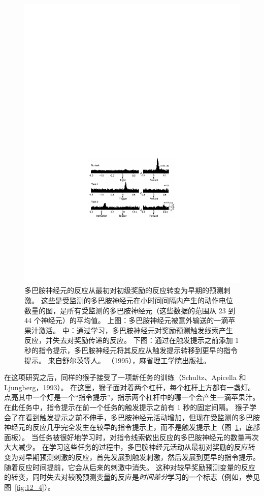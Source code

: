 \begin{figure}[!htb]
	\centering
	\includegraphics[width=0.5\linewidth]{chap12/fig_12_3}
	\caption{多巴胺神经元的反应从最初对初级奖励的反应转变为早期的预测刺激。
		这些是受监测的多巴胺神经元在小时间间隔内产生的动作电位数量的图，是所有受监测的多巴胺神经元（这些数据的范围从 23 到 44 个神经元）的平均值。
		上图：多巴胺神经元被意外输送的一滴苹果汁激活。
		中：通过学习，多巴胺神经元对奖励预测触发线索产生反应，并失去对奖励传递的反应。
		下图：通过在触发提示之前添加 1 秒的指令提示，多巴胺神经元将其反应从触发提示转移到更早的指令提示。
		来自舒尔茨等人。 （1995），麻省理工学院出版社。
		\label{fig:12_3}}
\end{figure}



在这项研究之后，同样的猴子接受了一项新任务的训练（Schultz、Apicella 和 Ljungberg，1993）。
在这里，猴子面对着两个杠杆，每个杠杆上方都有一盏灯。
点亮其中一个灯是一个“指令提示”，指示两个杠杆中的哪一个会产生一滴苹果汁。
在此任务中，指令提示在前一个任务的触发提示之前有 1 秒的固定间隔。
猴子学会了在看到触发提示之前不伸手，多巴胺神经元活动增加，但现在受监测的多巴胺神经元的反应几乎完全发生在较早的指令提示上，而不是触发提示上（图~\ref{fig:12_3}，底部面板）。
当任务被很好地学习时，对指令线索做出反应的多巴胺神经元的数量再次大大减少。
在学习这些任务的过程中，多巴胺神经元活动从最初对奖励的反应转变为对早期预测刺激的反应，首先发展到触发刺激，然后发展到更早的指令提示。
随着反应时间提前，它会从后来的刺激中消失。
这种对较早奖励预测变量的反应的转变，同时失去对较晚预测变量的反应是\textit{时间差分}学习的一个标志（例如，参见图~\ref{fig:12_4}）。


